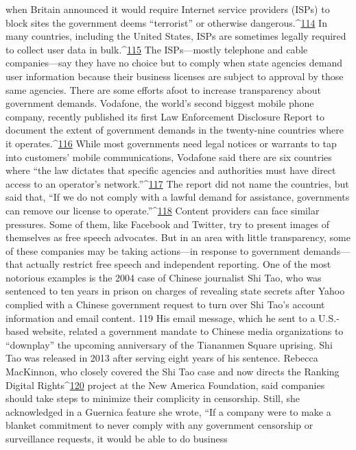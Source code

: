 when Britain announced it would require Internet service providers (ISPs) to block sites
the government deems ``terrorist'' or otherwise dangerous.^{\href{#endnotes}{114}} In many countries, including
the United States, ISPs are sometimes legally required to collect user data in bulk.^{\href{#endnotes}{115}} The
ISPs—mostly telephone and cable companies—say they have no choice but to comply
when state agencies demand user information because their business licenses are subject
to approval by those same agencies.
There are some efforts afoot to increase transparency about government demands.
Vodafone, the world’s second biggest mobile phone company, recently published its first
Law Enforcement Disclosure Report to document the extent of government demands in
the twenty-nine countries where it operates.^{\href{#endnotes}{116}} While most governments need legal
notices or warrants to tap into customers’ mobile communications, Vodafone said there
are six countries where ``the law dictates that specific agencies and authorities must have
direct access to an operator’s network.''^{\href{#endnotes}{117}} The report did not name the countries, but said
that, ``If we do not comply with a lawful demand for assistance, governments can remove
our license to operate.''^{\href{#endnotes}{118}}
Content providers can face similar pressures. Some of them, like Facebook and Twitter,
try to present images of themselves as free speech advocates. But in an area with little
transparency, some of these companies may be taking actions—in response to
government demands—that actually restrict free speech and independent reporting. One
of the most notorious examples is the 2004 case of Chinese journalist Shi Tao, who was
sentenced to ten years in prison on charges of revealing state secrets after Yahoo
complied with a Chinese government request to turn over Shi Tao’s account information
and email content. 119 His email message, which he sent to a U.S.-based website, related a
government mandate to Chinese media organizations to ``downplay'' the upcoming
anniversary of the Tiananmen Square uprising. Shi Tao was released in 2013 after
serving eight years of his sentence.
Rebecca MacKinnon, who closely covered the Shi Tao case and now directs the Ranking
Digital Rights^{\href{#endnotes}{120}} project at the New America Foundation, said companies should take
steps to minimize their complicity in censorship. Still, she acknowledged in a Guernica
feature she wrote, ``If a company were to make a blanket commitment to never comply
with any government censorship or surveillance requests, it would be able to do business
